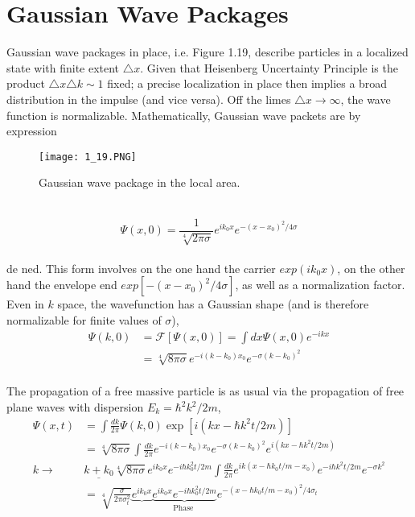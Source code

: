 \section{Gaussian Wave Packages}
Gaussian wave packages in place, i.e. Figure  1.19, describe particles in a localized state with finite extent $\triangle x$. Given that
Heisenberg Uncertainty Principle is the product $\triangle x\triangle k \sim 1$ fixed; a precise
localization in place then implies a broad distribution in the impulse (and
vice versa). Off the limes $\triangle x \to \infty$, the wave function is normalizable.
Mathematically, Gaussian wave packets are by expression
\begin{figure}[ht]
    \centering
    \texttt{[image: 1\_19.PNG]}
    \caption{Gaussian wave package in the local area.}
    \label{fig:1.19}
\end{figure}
\\
\begin{equation}
\Psi(x, 0)=\frac{1}{\sqrt[4]{2 \pi \sigma}} e^{i k_{0} x} e^{-\left(x-x_{0}\right)^{2} / 4 \sigma}
\end{equation}\\
de ned. This form involves on the one hand the carrier $exp(ik_0x)$, on the other hand
the envelope end $exp[-(x-x_0)^2/4\sigma]$, as well as a normalization factor.
Even in $k$ space, the wavefunction has a Gaussian shape (and is therefore
normalizable for finite values ​​of $\sigma$),
\\
\begin{equation}
\begin{aligned} \Psi(k, 0) &=\mathcal{F}[\Psi(x, 0)]=\int d x \Psi(x, 0) e^{-i k x} \\ &=\sqrt[4]{8 \pi \sigma} e^{-i\left(k-k_{0}\right) x_{0}} e^{-\sigma\left(k-k_{0}\right)^{2}} \end{aligned}
\end{equation}\\
The propagation of a free massive particle is as usual via
the propagation of free plane waves with dispersion $E_k=\hbar^2 k^2/2m$,
\\
\begin{equation}
\begin{aligned} 
    \Psi(x, t) &=\int \frac{d k}{2 \pi} \Psi(k, 0) \exp \left[i\left(k x-\hbar k^{2} t / 2 m\right)\right] \\ 
    &=\sqrt[4]{8 \pi \sigma} \int \frac{d k}{2 \pi} e^{-i\left(k-k_{0}\right) x_{0}} e^{-\sigma\left(k-k_{0}\right)^{2}} e^{i\left(k x-\hbar k^{2} t / 2 m\right)}\\
    k \rightarrow & \underline{k+k_{0}} \sqrt[4]{8 \pi \sigma} e^{i k_{0} x} e^{-i \hbar k_{0}^{2} t / 2 m} \int \frac{d k}{2 \pi} e^{i k\left(x-\hbar k_{0} t / m-x_{0}\right)} e^{-i \hbar k^{2} t / 2 m} e^{-\sigma k^{2}} \\ 
    &=\sqrt[4]{\frac{\sigma}{2 \pi \sigma_{t}^{2}}} \underbrace{e^{i k_{0} x}} \underbrace{e^{i k_{0} x} e^{-i \hbar k_{0}^{2} t / 2 m}}_{\text {Phase }} e^{-\left(x-\hbar k_{0} t / m-x_{0}\right)^{2} / 4 \sigma_{t}} 
\end{aligned}
\end{equation}\\
